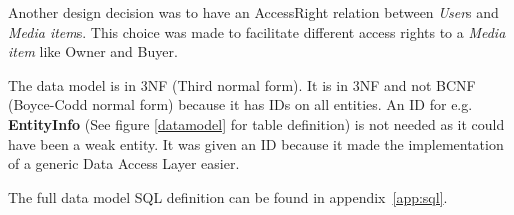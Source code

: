 \documentclass[../report.tex]{subfiles}
\begin{document}
Another design decision was to have an AccessRight relation between \textit{User}s and \textit{Media item}s. This choice was made to facilitate different access rights to a \textit{Media item} like Owner and Buyer.

The data model is in 3NF (Third normal form). It is in 3NF and not BCNF (Boyce-Codd normal form) because it has IDs on all entities. An ID for e.g. \textbf{EntityInfo} (See figure \ref{datamodel} for table definition) is not needed as it could have been a weak entity. It was given an ID because it made the implementation of a generic Data Access Layer easier.

The full data model SQL definition can be found in appendix~\ref{app:sql}.
\end{document}
